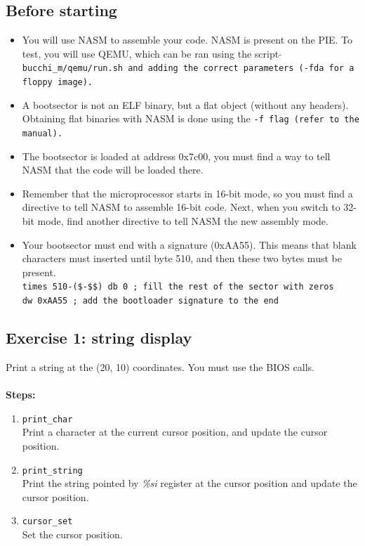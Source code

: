\subsection*{Before starting}

\begin{itemize}
\item
  You will use NASM to assemble your code. NASM is present on the
  PIE. To test, you will use QEMU, which can be ran using the script
  \tt $\tilde{}$bucchi\_m/qemu/run.sh \rm and adding the correct parameters
  (\tt -fda \rm for a floppy image).
\item
  A bootsector is not an ELF binary, but a flat object (without any
  headers). Obtaining flat binaries with NASM is done using the \tt -f \rm
  flag (refer to the manual).
\item
  The bootsector is loaded at address 0x7c00, you must find a way to
  tell NASM that the code will be loaded there.
\item
  Remember that the microprocessor starts in 16-bit mode, so you must
  find a directive to tell NASM to assemble 16-bit code. Next, when
  you switch to 32-bit mode, find another directive to tell NASM the
  new assembly mode.
\item
  Your bootsector must end with a signature (0xAA55). This means that
  blank characters must inserted until byte 510, and then these two
  bytes must be present.\\
  \tt times 510-(\$-\$\$) db 0	; fill the rest of the sector with zeros\\
  \tt dw 0xAA55			; add the bootloader signature to the end
\end{itemize}

\subsection*{Exercise 1: string display}
Print a string at the (20, 10) coordinates. You must use the BIOS calls.\\
\\
{\bf Steps:}
\begin{enumerate}
\item {\tt print\_char}\\
Print a character at the current cursor position, and update the cursor position.
\item {\tt print\_string}\\
Print the string pointed by {\em \%si} register at the cursor position and update the cursor position.
\item{\tt cursor\_set}\\
Set the cursor position.
\end{enumerate}




